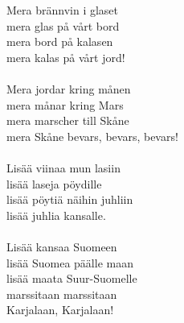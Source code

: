 
            Mera brännvin i glaset \\
            mera glas på vårt bord \\
            mera bord på kalasen \\
            mera kalas på vårt jord! \\
\hspace{10mm} \\
            Mera jordar kring månen \\
            mera månar kring Mars \\
            mera marscher till Skåne \\
            mera Skåne bevars, bevars, bevars! \\
\hspace{10mm} \\
            Lisää viinaa mun lasiin \\
            lisää laseja pöydille \\
            lisää pöytiä näihin juhliin \\
            lisää juhlia kansalle. \\
\hspace{10mm} \\
            Lisää kansaa Suomeen \\
            lisää Suomea päälle maan \\
            lisää maata Suur-Suomelle \\
            marssitaan marssitaan \\
            Karjalaan, Karjalaan! \\
